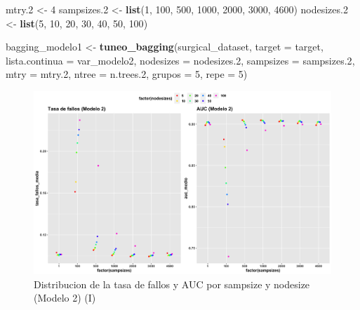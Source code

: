 \documentclass[
]{article}
\newenvironment{Shaded}{\begin{snugshade}}{\end{snugshade}}
\newcommand{\DataTypeTok}[1]{\textcolor[rgb]{0.13,0.29,0.53}{#1}}
\newcommand{\DecValTok}[1]{\textcolor[rgb]{0.00,0.00,0.81}{#1}}
\newcommand{\FloatTok}[1]{\textcolor[rgb]{0.00,0.00,0.81}{#1}}
\newcommand{\KeywordTok}[1]{\textcolor[rgb]{0.13,0.29,0.53}{\textbf{#1}}}
\newcommand{\NormalTok}[1]{#1}
\newcommand{\StringTok}[1]{\textcolor[rgb]{0.31,0.60,0.02}{#1}}
\begin{document}
\begin{Shaded}
\begin{Highlighting}[]
\NormalTok{mtry}\FloatTok{.2}\NormalTok{      <{-}}\StringTok{ }\DecValTok{4}
\NormalTok{sampsizes}\FloatTok{.2}\NormalTok{ <{-}}\StringTok{ }\KeywordTok{list}\NormalTok{(}\DecValTok{1}\NormalTok{, }\DecValTok{100}\NormalTok{, }\DecValTok{500}\NormalTok{, }\DecValTok{1000}\NormalTok{, }\DecValTok{2000}\NormalTok{, }\DecValTok{3000}\NormalTok{, }\DecValTok{4600}\NormalTok{)}
\NormalTok{nodesizes}\FloatTok{.2}\NormalTok{ <{-}}\StringTok{ }\KeywordTok{list}\NormalTok{(}\DecValTok{5}\NormalTok{, }\DecValTok{10}\NormalTok{, }\DecValTok{20}\NormalTok{, }\DecValTok{30}\NormalTok{, }\DecValTok{40}\NormalTok{, }\DecValTok{50}\NormalTok{, }\DecValTok{100}\NormalTok{)}

\NormalTok{bagging\_modelo1 <{-}}\StringTok{ }\KeywordTok{tuneo\_bagging}\NormalTok{(surgical\_dataset, }\DataTypeTok{target =}\NormalTok{ target,}
                                 \DataTypeTok{lista.continua =}\NormalTok{ var\_modelo2,}
                                 \DataTypeTok{nodesizes =}\NormalTok{ nodesizes}\FloatTok{.2}\NormalTok{,}
                                 \DataTypeTok{sampsizes =}\NormalTok{ sampsizes}\FloatTok{.2}\NormalTok{, }\DataTypeTok{mtry =}\NormalTok{ mtry}\FloatTok{.2}\NormalTok{,}
                                 \DataTypeTok{ntree =}\NormalTok{ n.trees}\FloatTok{.2}\NormalTok{, }\DataTypeTok{grupos =} \DecValTok{5}\NormalTok{, }\DataTypeTok{repe =} \DecValTok{5}\NormalTok{)}
\end{Highlighting}
\end{Shaded}

\begin{figure}[h!]

{\centering \includegraphics[width=0.99\linewidth,height=0.99\textheight,]{./charts/03_distribucion_auc_tasa_fallos_modelo2} 

}

\caption{Distribucion de la tasa de fallos y AUC por sampsize y nodesize (Modelo 2) (I)}\label{fig:unnamed-chunk-75}
\end{figure}
\end{document}
